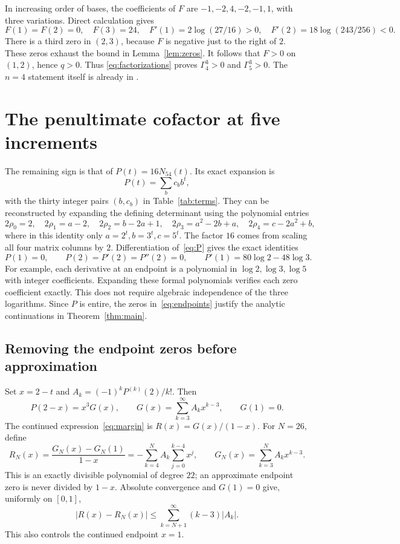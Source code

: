 \documentclass[11pt]{article}
\begin{document}
In increasing order of bases, the coefficients of $F$ are
$-1,-2,4,-2,-1,1$, with three variations. Direct calculation gives
\[
 F(1)=F(2)=0,\quad F(3)=24,\quad
 F'(1)=2\log(27/16)>0,\quad F'(2)=18\log(243/256)<0.
\]
There is a third zero in $(2,3)$, because $F$ is negative just to the
right of $2$. These zeros exhaust the bound in Lemma~\ref{lem:zeros}.
It follows that $F>0$ on $(1,2)$, hence $q>0$. Thus
\eqref{eq:factorizations} proves $\Gamma_4^3>0$ and $\Gamma_5^3>0$.
The $n=4$ statement itself is already in
\cite[Proposition~1]{Bodnarchuk2025}.

\section{The penultimate cofactor at five increments}

The remaining sign is that of $P(t)=16N_{54}(t)$. Its exact expansion is
\begin{equation}\label{eq:P}
 P(t)=\sum_b c_b b^t,
\end{equation}
with the thirty integer pairs $(b,c_b)$ in Table~\ref{tab:terms}.
They can be reconstructed by expanding the defining determinant using
the polynomial entries
\[
 2\rho_0=2,\quad 2\rho_1=a-2,\quad
 2\rho_2=b-2a+1,\quad 2\rho_3=a^2-2b+a,\quad
 2\rho_4=c-2a^2+b,
\]
where in this identity only $a=2^t,b=3^t,c=5^t$.
The factor $16$ comes from scaling all four matrix columns by $2$.
Differentiation of~\eqref{eq:P} gives the exact identities
\begin{equation}\label{eq:endpoints}
 P(1)=0,\qquad P(2)=P'(2)=P''(2)=0,
 \qquad P'(1)=80\log2-48\log3.
\end{equation}
For example, each derivative at an endpoint is a polynomial in
$\log2,\log3,\log5$ with integer coefficients. Expanding these formal
polynomials verifies each zero coefficient exactly. This does not require
algebraic independence of the three logarithms. Since $P$ is entire,
the zeros in~\eqref{eq:endpoints} justify the analytic continuations
in Theorem~\ref{thm:main}.

\subsection{Removing the endpoint zeros before approximation}

Set $x=2-t$ and $A_k=(-1)^kP^{(k)}(2)/k!$. Then
\[
 P(2-x)=x^3G(x),\qquad
 G(x)=\sum_{k=3}^{\infty}A_kx^{k-3},\qquad G(1)=0.
\]
The continued expression~\eqref{eq:margin} is $R(x)=G(x)/(1-x)$.
For $N=26$, define
\begin{equation}\label{eq:RN}
 R_N(x)=\frac{G_N(x)-G_N(1)}{1-x}
       =-\sum_{k=4}^N A_k\sum_{j=0}^{k-4}x^j,
 \qquad G_N(x)=\sum_{k=3}^N A_kx^{k-3}.
\end{equation}
This is an exactly divisible polynomial of degree $22$; an approximate
endpoint zero is never divided by $1-x$. Absolute convergence and
$G(1)=0$ give, uniformly on $[0,1]$,
\begin{equation}\label{eq:tail}
 |R(x)-R_N(x)|\le\sum_{k=N+1}^{\infty}(k-3)|A_k|.
\end{equation}
This also controls the continued endpoint $x=1$.
\end{document}
